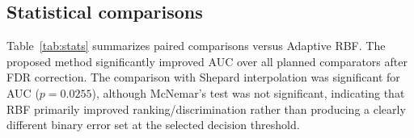 \documentclass[preprint,12pt]{elsarticle}
\begin{document}
\begin{table}[t]
\centering
\caption{Backbone comparison for detector-guided synthetic images generated with threshold $0.50$ and top-$4$ detections.}
\label{tab:backbones}
\end{table}

\subsection{Statistical comparisons}

Table~\ref{tab:stats} summarizes paired comparisons versus Adaptive RBF. The proposed method significantly improved AUC over all planned comparators after FDR correction. The comparison with Shepard interpolation was significant for AUC ($p=0.0255$), although McNemar's test was not significant, indicating that RBF primarily improved ranking/discrimination rather than producing a clearly different binary error set at the selected decision threshold.
\end{document}
